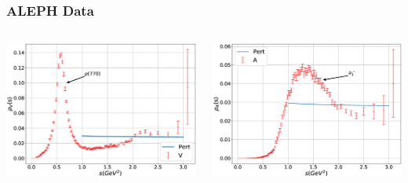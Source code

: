 \documentclass[fleqn]{beamer}
\begin{document}
\begin{frame}
  \frametitle{ALEPH Data}
  \begin{columns}
    \begin{column}{0.5\textwidth}
      \includegraphics[width=\textwidth]{./images/specFuncAleph_V.eps}
    \end{column}
    \begin{column}{0.5\textwidth}
      \includegraphics[width=\textwidth]{./images/specFuncAleph_A.eps}
    \end{column}
  \end{columns}
\end{frame}
\end{document}
